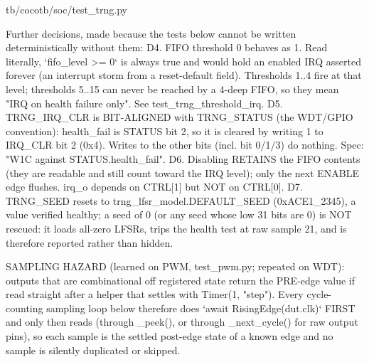 \begin{relocated}{tb/cocotb/soc/test_trng.py}
\begin{textblock}
Further decisions, made because the tests below cannot be written deterministically without them:
D4. FIFO threshold 0 behaves as 1. Read literally, `fifo_level >= 0` is always true and would hold
an enabled IRQ asserted forever (an interrupt storm from a reset-default field). Thresholds
1..4 fire at that level; thresholds 5..15 can never be reached by a 4-deep FIFO, so they mean
"IRQ on health failure only". See test_trng_threshold_irq.
D5. TRNG_IRQ_CLR is BIT-ALIGNED with TRNG_STATUS (the WDT/GPIO convention): health_fail is STATUS
bit 2, so it is cleared by writing 1 to IRQ_CLR bit 2 (0x4). Writes to the other bits (incl.
bit 0/1/3) do nothing. Spec: "W1C against STATUS.health_fail".
D6. Disabling RETAINS the FIFO contents (they are readable and still count toward the IRQ level);
only the next ENABLE edge flushes. irq_o depends on CTRL[1] but NOT on CTRL[0].
D7. TRNG_SEED resets to trng_lfsr_model.DEFAULT_SEED (0xACE1_2345), a value verified healthy;
a seed of 0 (or any seed whose low 31 bits are 0) is NOT rescued: it loads all-zero LFSRs,
trips the health test at raw sample 21, and is therefore reported rather than hidden.

SAMPLING HAZARD (learned on PWM, test_pwm.py; repeated on WDT): outputs that are combinational off
registered state return the PRE-edge value if read straight after a helper that settles with
Timer(1, "step"). Every cycle-counting sampling loop below therefore does
`await RisingEdge(dut.clk)` FIRST and only then reads (through _peek(), or through _next_cycle()
for raw output pins), so each sample is the settled post-edge state of a known edge and no sample is
silently duplicated or skipped.


\end{textblock}
\end{relocated}
